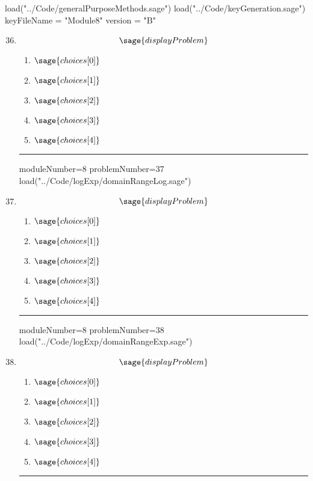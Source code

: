 \documentclass[14pt]{article}
\newcommand{\litem}[1]{\item#1\hspace*{-1cm}\rule{\textwidth}{0.4pt}}
\begin{document}
\pagestyle{fancy}

\begin{sagesilent}
load("../Code/generalPurposeMethods.sage")
load("../Code/keyGeneration.sage")
keyFileName = "Module8"
version = "B"
\end{sagesilent}

\begin{enumerate}
\setcounter{enumi}{35}


\begin{sagesilent}
moduleNumber=8
problemNumber = 36
load("../Code/logExp/solveExpDifferentBases.sage")
\end{sagesilent}

\litem{

\[ \sage{displayProblem} \]

\begin{enumerate}[label=\Alph*.]
\item \( \sage{choices[0]} \)
\item \( \sage{choices[1]} \)
\item \( \sage{choices[2]} \)
\item \( \sage{choices[3]} \)
\item \( \sage{choices[4]} \)
\end{enumerate} }


\begin{sagesilent}
moduleNumber=8
problemNumber=37
load("../Code/logExp/domainRangeLog.sage")
\end{sagesilent}

\litem{ 
\[ \sage{displayProblem} \]
	\begin{enumerate}[label=\Alph*.]
		\item \( \sage{choices[0]} \)
		\item \( \sage{choices[1]} \)
		\item \( \sage{choices[2]} \)
		\item \( \sage{choices[3]} \)
		\item \( \sage{choices[4]} \)
	\end{enumerate}
}

\begin{sagesilent}
moduleNumber=8
problemNumber=38
load("../Code/logExp/domainRangeExp.sage")
\end{sagesilent}

\litem{ 
\[ \sage{displayProblem} \]
	\begin{enumerate}[label=\Alph*.]
  \item \( \sage{choices[0]} \)
  \item \( \sage{choices[1]} \)
  \item \( \sage{choices[2]} \)
  \item \( \sage{choices[3]} \)
  \item \( \sage{choices[4]} \)
	\end{enumerate}
}


\end{enumerate}
\end{document}
